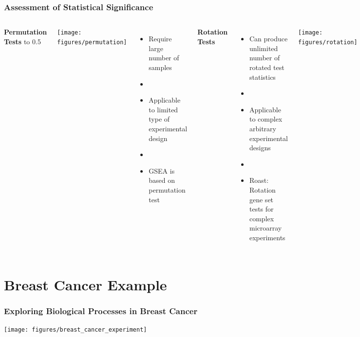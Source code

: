 \documentclass[9pt,t]{beamer}
\begin{document}
\begin{frame}
	\frametitle{Assessment of Statistical Significance}
	\vspace{0.1cm}
	\begin{columns}
	\centering
    \textbf{\color{oxygenpurple} Permutation Tests}
	\vbox to 0.5\textheight
	{
	\vspace{0.02\textwidth}
	\centering
    \texttt{[image: figures/permutation]}                
	\vspace{0.02cm}
	\begin{itemize}
		\item Require large number of samples 
		\item[]
		\item Applicable to limited type of experimental design
		\item[]
		\item GSEA is based on permutation test
		\end{itemize}
    }                       
	\centering
	{\color{oxygenpurple}\textbf{Rotation Tests}}
	\begin{itemize}
	\item Can produce unlimited number of rotated test statistics
	\item[]
	\item Applicable to complex arbitrary experimental designs
	\item[]	
	\item Roast: Rotation gene set tests for complex microarray experiments
	\end{itemize}
	\vspace{0.02cm}
	\texttt{[image: figures/rotation]}
	\end{columns}
\end{frame}

\section{Breast Cancer Example}
\begin{frame}
	\frametitle{Exploring Biological Processes in Breast Cancer}
	\centering
	\texttt{[image: figures/breast\_cancer\_experiment]}
\end{frame}
\end{document}
